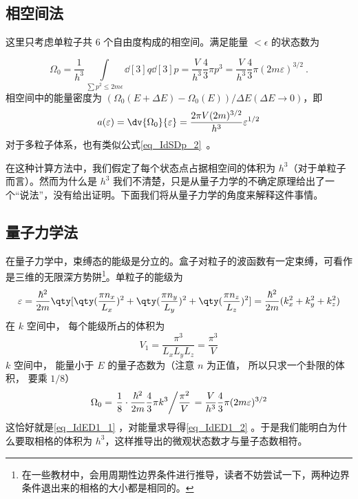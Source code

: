 
\subsection{相空间法}
这里只考虑单粒子共 $6$ 个自由度构成的相空间。满足能量 $<\epsilon$ 的状态数为

\begin{equation}\label{eq_IdED1_1}
\Omega_0 = \frac{1}{h^3}\int\limits_{\sum {p^2}  \leqslant 2m\epsilon} \dd[3]{q} \dd[3]{p}
 = \frac{V}{h^3}\frac43 \pi {p^3}
 = \frac{V}{h^3}\frac43 \pi (2m\varepsilon)^{3/2}~.
\end{equation}
相空间中的能量密度为 $(\Omega_0(E+\Delta E)-\Omega_0(E))/\Delta E(\Delta E\rightarrow 0)$，即
\begin{equation}\label{eq_IdED1_2}
a(\varepsilon) = \dv{\Omega_0}{\varepsilon} = \frac{2\pi V(2m)^{3/2}}{h^3} \varepsilon^{1/2}
\end{equation}
对于多粒子体系，也有类似公式\autoref{eq_IdSDp_2}~。

在这种计算方法中，我们假定了每个状态点占据相空间的体积为 $h^3$（对于单粒子而言）。然而为什么是 $h^3$ 我们不清楚，只是从量子力学的不确定原理给出了一个“说法”，没有给出证明。下面我们将从量子力学的角度来解释这件事情。
\subsection{量子力学法}
在量子力学中，束缚态的能级是分立的。盒子对粒子的波函数有一定束缚，可看作是三维的无限深方势阱\footnote{在一些教材中，会用周期性边界条件进行推导，读者不妨尝试一下，两种边界条件退出来的相格的大小都是相同的。}。单粒子的能级为
\begin{equation}
\varepsilon = \frac{\hbar ^2}{2m} \qty[\qty(\frac{\pi n_x}{L_x})^2 + \qty(\frac{\pi n_y}{L_y})^2 + \qty(\frac{\pi n_z}{L_z})^2] = \frac{\hbar ^2}{2m} (k_x^2 + k_y^2 + k_z^2)
\end{equation}
在 $k$ 空间中， 每个能级所占的体积为
\begin{equation}
V_1 = \frac{\pi^3}{L_x L_y L_z} = \frac{\pi^3}{V}
\end{equation}
$k$ 空间中， 能量小于 $E$ 的量子态数为（注意 $n$ 为正值， 所以只求一个卦限的体积， 要乘 $1/8$）
\begin{equation}
\Omega_0 = \left. \frac18\cdot \frac{\hbar^2}{2m}\frac43 \pi k^3 \middle/ \frac{\pi^2}{V} \right. = \frac{V}{h^3}\frac43 \pi(2m\varepsilon)^{3/2}
\end{equation}
这恰好就是\autoref{eq_IdED1_1} ，对能量求导得\autoref{eq_IdED1_2} 。于是我们能明白为什么要取相格的体积为 $h^3$，这样推导出的微观状态数才与量子态数相符。